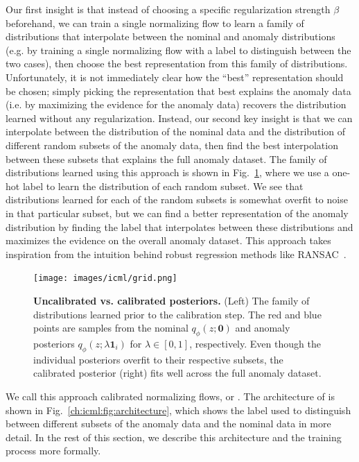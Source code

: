 Our first insight is that instead of choosing a specific regularization strength $\beta$ beforehand, we can train a single normalizing flow to learn a family of distributions that interpolate between the nominal and anomaly distributions (e.g. by training a single normalizing flow with a label to distinguish between the two cases), then choose the best representation from this family of distributions. Unfortunately, it is not immediately clear how the ``best'' representation should be chosen; simply picking the representation that best explains the anomaly data (i.e. by maximizing the evidence for the anomaly data) recovers the distribution learned without any regularization. Instead, our second key insight is that we can interpolate between the distribution of the nominal data and the distribution of different random subsets of the anomaly data, then find the best interpolation between these subsets that explains the full anomaly dataset. The family of distributions learned using this approach is shown in Fig.~\ref{ch:icml:fig:grid}, where we use a one-hot label to learn the distribution of each random subset. We see that distributions learned for each of the random subsets is somewhat overfit to noise in that particular subset, but we can find a better representation of the anomaly distribution by finding the label that interpolates between these distributions and maximizes the evidence on the overall anomaly dataset. This approach takes inspiration from the intuition behind robust regression methods like RANSAC~\cite{fischlerRandomSampleConsensus1981}.

\begin{figure}[ht]
    \centering
    \texttt{[image: images/icml/grid.png]}
    \caption{\textbf{Uncalibrated vs. calibrated posteriors.} (Left) The family of distributions learned prior to the calibration step. The red and blue points are samples from the nominal $q_\phi(z; \mathbf{0})$ and anomaly posteriors $q_\phi(z; \lambda \mathbf{1}_i)$ for $\lambda \in [0, 1]$, respectively. Even though the individual posteriors overfit to their respective subsets, the calibrated posterior (right) fits well across the full anomaly dataset.}
    \label{ch:icml:fig:grid}
\end{figure}

We call this approach calibrated normalizing flows, or \ouralg{}. The architecture of \ouralg{} is shown in Fig.~\ref{ch:icml:fig:architecture}, which shows the label used to distinguish between different subsets of the anomaly data and the nominal data in more detail. In the rest of this section, we describe this architecture and the training process more formally.

